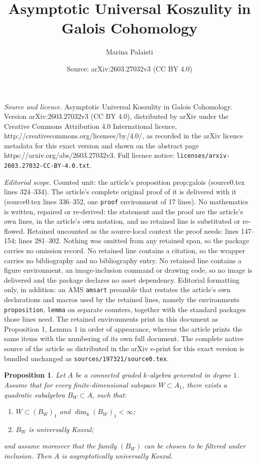 \documentclass[10pt,a4paper]{amsart}
\title{Asymptotic Universal Koszulity in Galois Cohomology}
\author{Marina Palaisti}
\date{Source: arXiv:2603.27032v3 (CC BY 4.0)}
\newtheorem{proposition}{Proposition}
\begin{document}
\maketitle

\noindent\emph{Source and licence.} Asymptotic Universal Koszulity in Galois Cohomology. Version arXiv:2603.27032v3 (CC BY 4.0), distributed by arXiv under the Creative Commons Attribution 4.0 International licence, http://creativecommons.org/licenses/by/4.0/, as recorded in the arXiv licence metadata for this exact version and shown on the abstract page https://arxiv.org/abs/2603.27032v3. Full licence notice: \texttt{licenses/arxiv-2603.27032-CC-BY-4.0.txt}.\par\smallskip

\noindent\textit{Editorial scope.} Counted unit: the article's proposition prop:galois (source0.tex lines 324--334). The article's complete original proof of it is delivered with it (source0.tex lines 336--352, one \texttt{proof} environment of 17 lines). No mathematics is written, repaired or re-derived: the statement and the proof are the article's own lines, in the article's own notation, and no retained line is substituted or re-flowed.  Retained uncounted as the source-local context the proof needs: lines 147--154; lines 281--302.  Nothing was omitted from any retained span, so the package carries no omission record.  No retained line contains a citation, so the wrapper carries no bibliography and no bibliography entry.  No retained line contains a figure environment, an image-inclusion command or drawing code, so no image is delivered and the package declares no asset dependency.  Editorial formatting only, in addition: an AMS \texttt{amsart} preamble that restates the article's own declarations and macros used by the retained lines, namely the environments \texttt{proposition}, \texttt{lemma} on separate counters, together with the standard packages those lines need.  The retained environments print in this document as Proposition 1, Lemma 1 in order of appearance, whereas the article prints the same items with the numbering of its own full document.  The complete native source of the article as distributed in the arXiv e-print for this exact version is bundled unchanged as \texttt{sources/197321/source0.tex}.
	\begin{proposition}\label{prop:local}
		Let \(A\) be a connected graded $k$-algebra generated in degree \(1\). Assume that for every finite-dimensional subspace \(W \subset A_1\), there exists a quadratic subalgebra \(B_W \subset A\), such that:
		\begin{enumerate}[label=(\alph*)]
			\item \(W \subset (B_W)_1\) and \(\dim_k (B_W)_1 < \infty\);
			\item \(B_W\) is universally Koszul;
		\end{enumerate}
		and assume moreover that the family \((B_W)\) can be chosen to be filtered under inclusion. Then \(A\) is asymptotically universally Koszul.
	\end{proposition}
\end{document}
